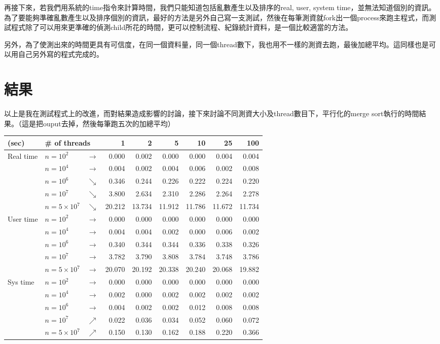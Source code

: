 \documentclass[12pt, a4paper]{article}
\begin{document}
再接下來，若我們用系統的time指令來計算時間，我們只能知道包括亂數產生以及排序的real, user, system time，並無法知道個別的資訊。為了要能夠準確亂數產生以及排序個別的資訊，最好的方法是另外自己寫一支測試，然後在每筆測資就fork出一個process來跑主程式，而測試程式除了可以用來更準確的偵測child所花的時間，更可以控制流程、紀錄統計資料，是一個比較適當的方法。

另外，為了使測出來的時間更具有可信度，在同一個資料量，同一個thread數下，我也用不一樣的測資去跑，最後加總平均。這同樣也是可以用自己另外寫的程式完成的。

\section{結果}
以上是我在測試程式上的改進，而對結果造成影響的討論，接下來討論不同測資大小及thread數目下，平行化的merge sort執行的時間結果。（這是把ouput去掉，然後每筆跑五次的加總平均）
\begin{center}
\begin{tabular}{l | l l r r r r r r}
\hline
(sec)& \multicolumn{2}{|l}{\# of threads} & 1 & 2 & 5 & 10 & 25 & 100 \\ \hline
\multirow{5}{*}{Real time}
& $n=10^2$ & $\rightarrow$ & 0.000 & 0.002 & 0.000 & 0.000 & 0.004 & 0.004 \\ \cline{2-9}
& $n=10^4$ & $\rightarrow$ & 0.004 & 0.002 & 0.004 & 0.006 & 0.002 & 0.008 \\ \cline{2-9}
& $n=10^6$ & $\searrow$ & 0.346 & 0.244 & 0.226 & 0.222 & 0.224 & 0.220 \\ \cline{2-9}
& $n=10^7$ & $\searrow$ & 3.800 & 2.634 & 2.310 & 2.286 & 2.264 & 2.278 \\ \cline{2-9}
& $n=5\times10^7$ & $\searrow$ & 20.212 & 13.734 & 11.912 & 11.786 & 11.672 & 11.734 \\
\hline\hline
\multirow{5}{*}{User time}
& $n=10^2$ & $\rightarrow$ & 0.000 & 0.000 & 0.000 & 0.000 & 0.000 & 0.000 \\ \cline{2-9}
& $n=10^4$ & $\rightarrow$ & 0.004 & 0.004 & 0.002 & 0.000 & 0.006 & 0.002 \\ \cline{2-9}
& $n=10^6$ & $\rightarrow$ & 0.340 & 0.344 & 0.344 & 0.336 & 0.338 & 0.326 \\ \cline{2-9}
& $n=10^7$ & $\rightarrow$ & 3.782 & 3.790 & 3.808 & 3.784 & 3.748 & 3.786 \\ \cline{2-9}
& $n=5\times10^7$ & $\rightarrow$ & 20.070 & 20.192 & 20.338 & 20.240 & 20.068 & 19.882 \\
\hline\hline
\multirow{5}{*}{Sys time}
& $n=10^2$ & $\rightarrow$ & 0.000 & 0.000 & 0.000 & 0.000 & 0.000 & 0.000 \\ \cline{2-9}
& $n=10^4$ & $\rightarrow$ & 0.002 & 0.000 & 0.002 & 0.002 & 0.002 & 0.002 \\ \cline{2-9}
& $n=10^6$ & $\rightarrow$ & 0.004 & 0.002 & 0.002 & 0.012 & 0.008 & 0.008 \\ \cline{2-9}
& $n=10^7$ & $\nearrow$ & 0.022 & 0.036 & 0.034 & 0.052 & 0.060 & 0.072 \\ \cline{2-9}
& $n=5\times10^7$ & $\nearrow$ & 0.150 & 0.130 & 0.162 & 0.188 & 0.220 & 0.366 \\
\hline
\end{tabular}
\end{center}
\end{document}
